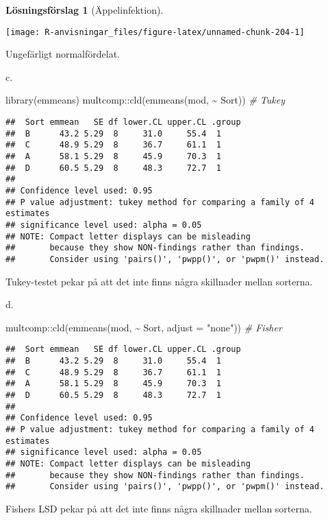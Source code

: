 \documentclass[
]{book}
\newenvironment{Shaded}{\begin{snugshade}}{\end{snugshade}}
\newcommand{\AttributeTok}[1]{\textcolor[rgb]{0.77,0.63,0.00}{#1}}
\newcommand{\CommentTok}[1]{\textcolor[rgb]{0.56,0.35,0.01}{\textit{#1}}}
\newcommand{\FunctionTok}[1]{\textcolor[rgb]{0.00,0.00,0.00}{#1}}
\newcommand{\NormalTok}[1]{#1}
\newcommand{\SpecialCharTok}[1]{\textcolor[rgb]{0.00,0.00,0.00}{#1}}
\newcommand{\StringTok}[1]{\textcolor[rgb]{0.31,0.60,0.02}{#1}}
\theoremstyle{definition}
\theoremstyle{definition}
\theoremstyle{definition}
\theoremstyle{definition}
\newtheorem{hypothesis}{Lösningsförslag}[chapter]
\theoremstyle{remark}
\begin{document}
\begin{hypothesis}[Äppelinfektion]
\begin{center}\texttt{[image: R-anvisningar\_files/figure-latex/unnamed-chunk-204-1]} \end{center}

Ungefärligt normalfördelat.

c.

\begin{Shaded}
\begin{Highlighting}[]
\FunctionTok{library}\NormalTok{(emmeans)}
\NormalTok{multcomp}\SpecialCharTok{::}\FunctionTok{cld}\NormalTok{(}\FunctionTok{emmeans}\NormalTok{(mod, }\SpecialCharTok{\textasciitilde{}}\NormalTok{ Sort)) }\CommentTok{\# Tukey}
\end{Highlighting}
\end{Shaded}

\begin{verbatim}
##  Sort emmean   SE df lower.CL upper.CL .group
##  B      43.2 5.29  8     31.0     55.4  1    
##  C      48.9 5.29  8     36.7     61.1  1    
##  A      58.1 5.29  8     45.9     70.3  1    
##  D      60.5 5.29  8     48.3     72.7  1    
## 
## Confidence level used: 0.95 
## P value adjustment: tukey method for comparing a family of 4 estimates 
## significance level used: alpha = 0.05 
## NOTE: Compact letter displays can be misleading
##       because they show NON-findings rather than findings.
##       Consider using 'pairs()', 'pwpp()', or 'pwpm()' instead.
\end{verbatim}

Tukey-testet pekar på att det inte finns några skillnader mellan sorterna.

d.

\begin{Shaded}
\begin{Highlighting}[]
\NormalTok{multcomp}\SpecialCharTok{::}\FunctionTok{cld}\NormalTok{(}\FunctionTok{emmeans}\NormalTok{(mod, }\SpecialCharTok{\textasciitilde{}}\NormalTok{ Sort, }\AttributeTok{adjust =} \StringTok{"none"}\NormalTok{)) }\CommentTok{\# Fisher}
\end{Highlighting}
\end{Shaded}

\begin{verbatim}
##  Sort emmean   SE df lower.CL upper.CL .group
##  B      43.2 5.29  8     31.0     55.4  1    
##  C      48.9 5.29  8     36.7     61.1  1    
##  A      58.1 5.29  8     45.9     70.3  1    
##  D      60.5 5.29  8     48.3     72.7  1    
## 
## Confidence level used: 0.95 
## P value adjustment: tukey method for comparing a family of 4 estimates 
## significance level used: alpha = 0.05 
## NOTE: Compact letter displays can be misleading
##       because they show NON-findings rather than findings.
##       Consider using 'pairs()', 'pwpp()', or 'pwpm()' instead.
\end{verbatim}

Fishers LSD pekar på att det inte finns några skillnader mellan sorterna.
\end{hypothesis}
\end{document}
